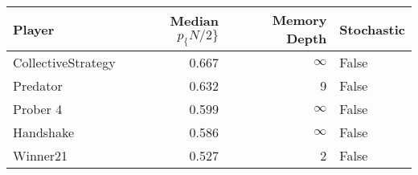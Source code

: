 \begin{tabular}{lrrl}
\toprule
             Player &  Median $p_\{N/2\}$ &  Memory Depth & Stochastic \\
\midrule
 CollectiveStrategy &             0.667 &            \(\infty\) &      False \\
           Predator &             0.632 &             9 &      False \\
           Prober 4 &             0.599 &            \(\infty\) &      False \\
          Handshake &             0.586 &            \(\infty\) &      False \\
           Winner21 &             0.527 &             2 &      False \\
\bottomrule
\end{tabular}
